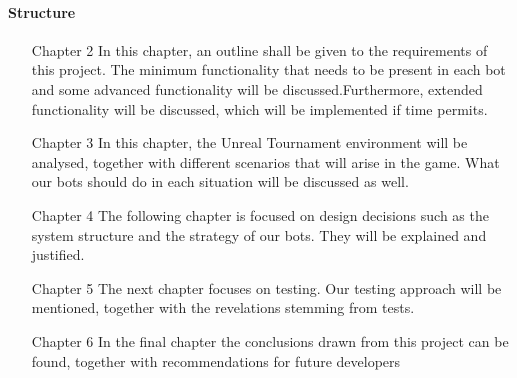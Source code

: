 \paragraph{Structure}

\begin{enumerate}
\item[Chapter 2] In this chapter, an outline shall be given to the requirements of this project. The minimum functionality that needs to be present in each bot and some advanced functionality will be discussed.Furthermore, extended functionality will be discussed, which will be implemented if time permits.

\item[Chapter 3] In this chapter, the Unreal Tournament environment will be analysed, together with different scenarios that will arise in the game. What our bots should do in each situation will be discussed as well.

\item[Chapter 4] The following chapter is focused on design decisions such as the system structure and the strategy of our bots. They will be explained and justified.

\item[Chapter 5] The next chapter focuses on testing. Our testing approach will be mentioned, together with the revelations stemming from tests.

\item[Chapter 6] In the final chapter the conclusions drawn from this project can be found, together with recommendations for future developers
\end{enumerate}
